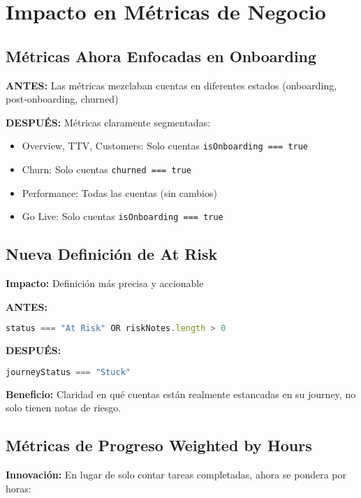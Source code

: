 \documentclass[12pt,a4paper]{article}
\begin{document}
\section{Impacto en Métricas de Negocio}

\subsection{Métricas Ahora Enfocadas en Onboarding}

\textbf{ANTES:} Las métricas mezclaban cuentas en diferentes estados (onboarding, post-onboarding, churned)

\textbf{DESPUÉS:} Métricas claramente segmentadas:
\begin{itemize}
    \item Overview, TTV, Customers: Solo cuentas \texttt{isOnboarding === true}
    \item Churn: Solo cuentas \texttt{churned === true}
    \item Performance: Todas las cuentas (sin cambios)
    \item Go Live: Solo cuentas \texttt{isOnboarding === true}
\end{itemize}

\subsection{Nueva Definición de At Risk}

\textbf{Impacto:} Definición más precisa y accionable

\textbf{ANTES:}
\begin{lstlisting}[language=JavaScript]
status === "At Risk" OR riskNotes.length > 0
\end{lstlisting}

\textbf{DESPUÉS:}
\begin{lstlisting}[language=JavaScript]
journeyStatus === "Stuck"
\end{lstlisting}

\textbf{Beneficio:} Claridad en qué cuentas están realmente estancadas en su journey, no solo tienen notas de riesgo.

\subsection{Métricas de Progreso Weighted by Hours}

\textbf{Innovación:} En lugar de solo contar tareas completadas, ahora se pondera por horas:
\end{document}
